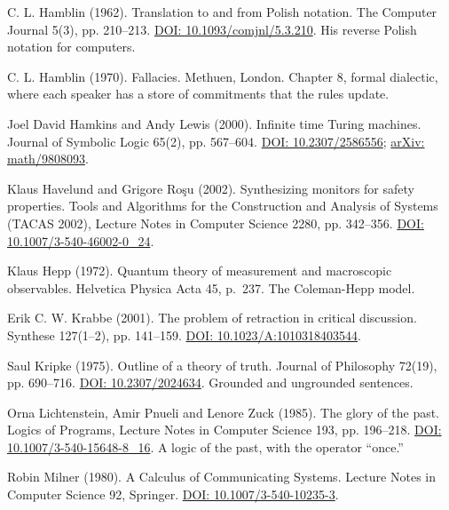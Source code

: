 \documentclass[11pt,twoside]{article}
\theoremstyle{thielethm}
\theoremstyle{thieledef}
\theoremstyle{thieledef}
\theoremstyle{thieledef}
\theoremstyle{thielethm}
\theoremstyle{thieleobs}
\theoremstyle{thielethm}
\begin{document}
\noindent C. L. Hamblin (1962). Translation to and from Polish notation. The Computer Journal 5(3), pp. 210--213. \href{https://doi.org/10.1093/comjnl/5.3.210}{DOI: 10.1093/comjnl/5.3.210}. His reverse Polish notation for computers.
\par\medskip

\noindent C. L. Hamblin (1970). Fallacies. Methuen, London. Chapter 8, formal dialectic, where each speaker has a store of commitments that the rules update.
\par\medskip

\noindent Joel David Hamkins and Andy Lewis (2000). Infinite time Turing machines. Journal of Symbolic Logic 65(2), pp. 567--604. \href{https://doi.org/10.2307/2586556}{DOI: 10.2307/2586556}; \href{https://arxiv.org/abs/math/9808093}{arXiv: math/9808093}.
\par\medskip

\noindent Klaus Havelund and Grigore Ro\c{s}u (2002). Synthesizing monitors for safety properties. Tools and Algorithms for the Construction and Analysis of Systems (TACAS 2002), Lecture Notes in Computer Science 2280, pp. 342--356. \href{https://doi.org/10.1007/3-540-46002-0_24}{DOI: 10.1007/3-540-46002-0\_24}.
\par\medskip

\noindent Klaus Hepp (1972). Quantum theory of measurement and macroscopic observables. Helvetica Physica Acta 45, p.~237. The Coleman-Hepp model.
\par\medskip

\noindent Erik C. W. Krabbe (2001). The problem of retraction in critical discussion. Synthese 127(1--2), pp. 141--159. \href{https://doi.org/10.1023/A:1010318403544}{DOI: 10.1023/A:1010318403544}.
\par\medskip

\noindent Saul Kripke (1975). Outline of a theory of truth. Journal of Philosophy 72(19), pp. 690--716. \href{https://doi.org/10.2307/2024634}{DOI: 10.2307/2024634}. Grounded and ungrounded sentences.
\par\medskip

\noindent Orna Lichtenstein, Amir Pnueli and Lenore Zuck (1985). The glory of the past. Logics of Programs, Lecture Notes in Computer Science 193, pp. 196--218. \href{https://doi.org/10.1007/3-540-15648-8_16}{DOI: 10.1007/3-540-15648-8\_16}. A logic of the past, with the operator ``once.''
\par\medskip

\noindent Robin Milner (1980). A Calculus of Communicating Systems. Lecture Notes in Computer Science 92, Springer. \href{https://doi.org/10.1007/3-540-10235-3}{DOI: 10.1007/3-540-10235-3}.
\par\medskip
\end{document}
